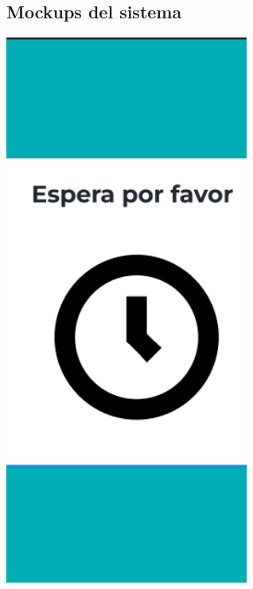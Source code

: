 \subsection{Mockups del sistema}
\begin{center}
    \includegraphics[width=0.6\textwidth]{Images/Cap 3/Pantalla1.png}
\end{center}

